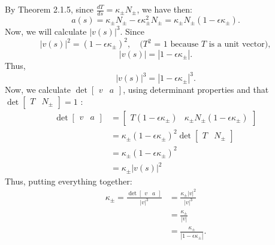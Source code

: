 \documentclass[12pt]{article}
\newcommand\abs[1]{\left| #1 \right|}
\newcommand\parens[1]{\left( #1 \right)}
\begin{document}
{\begin{enumerate}[(a)]
        By Theorem 2.1.5, since $\frac{dT}{ds} = \kappa_\pm N_\pm$, we have then:
        \[a(s) = \kappa_\pm N_\pm - \epsilon \kappa_\pm^2 N_\pm = \kappa_\pm N_\pm\parens{1 - \epsilon\kappa_\pm}.\]
        Now, we will calculate $\abs{v\parens{s}}^3$. Since
        \[\abs{v\parens{s}}^2 = \parens{1 - \epsilon\kappa_\pm}^2, \quad \text{($T^2$ = 1 because $T$ is a unit vector)},\]
        \[\abs{v\parens{s}} = \abs{1 - \epsilon\kappa_\pm}.\]
        Thus,
        \[\abs{v\parens{s}}^3 = \abs{1 - \epsilon\kappa_\pm}^3.\]
        Now, we calculate $\det \begin{bmatrix} v & a \end{bmatrix}$, using determinant properties and that $\det \begin{bmatrix} T & N_\pm \end{bmatrix} = 1$ :
        \begin{align*}
            \det \begin{bmatrix} v & a \end{bmatrix} &= 
            \begin{bmatrix}
                T\parens{1 - \epsilon\kappa_\pm} & \kappa_\pm N_\pm\parens{1 - \epsilon\kappa_\pm}
            \end{bmatrix} \\
            &= \kappa_\pm\parens{1 - \epsilon\kappa_\pm}^2 \det \begin{bmatrix} T & N_\pm \end{bmatrix} \\
            &= \kappa_\pm\parens{1 - \epsilon\kappa_\pm}^2 \\
            &= \kappa_\pm \abs{v\parens{s}}^2
        \end{align*}
        Thus, putting everything together:
        \begin{align*}
            \kappa_\pm = \frac{\det \begin{bmatrix} v & a \end{bmatrix}}{\abs{v}^3} &= \frac{\kappa_\pm \abs{v}^2}{\abs{v}^3} \\
            &= \frac{\kappa_\pm}{\abs{v}} \\
            &= \frac{\kappa_\pm}{\abs{1 - \epsilon\kappa_\pm}}.
        \end{align*}
    \end{enumerate}
}
\end{document}
